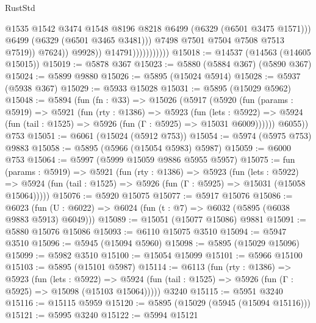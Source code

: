 \begin{lexlean}{RustStd}
\begin{coremodule}
{{                                          @1535
                                          @1542
                                          @3474
                                          @1548
                                          @8196
                                          @8218
                                          @6499
                                          (@6329 (@6501 @3475 @1571)))
                                        @6499
                                        (@6329 (@6501 @3465 @3481)))
                                      @7498
                                      @7501
                                      @7504
                                      @7508
                                      @7513
                                      @7519))
                                  @7624))
                              @9928))
                          @14791)))))))))))
@15018 := @14537 (@14563 (@14605 @15015))
@15019 := @5878 @367
@15023 := @5880 (@5884 @367) (@5890 @367)
@15024 := @5899 @9880
@15026 := @5895 (@15024 @5914)
@15028 := @5937 (@5938 @367)
@15029 := @5933 @15028
@15031 := @5895 (@15029 @5962)
@15048 := @5894
    (fun (fn : @33) =>
    @15026
      (@5917
        (@5920
          (fun (params : @5919) =>
          @5921
            (fun (rty : @1386) =>
            @5923
              (fun (lets : @5922) =>
              @5924 (fun (tail : @1525) => @5926 (fun (Γ : @5925) => @15031 @6009))))))
        @6055))
    @753
@15051 := @6061 (@15024 (@5912 @753))
@15054 := @5974 (@5975 @753) @9883
@15058 := @5895 (@5966 (@15054 @5983) @5987)
@15059 := @6000 @753
@15064 := @5997 (@5999 @15059 @9886 @5955 @5957)
@15075 := fun (params : @5919) =>
  @5921
    (fun (rty : @1386) =>
    @5923
      (fun (lets : @5922) =>
      @5924 (fun (tail : @1525) => @5926 (fun (Γ : @5925) => @15031 (@15058 @15064)))))
@15076 := @5920 @15075
@15077 := @5917 @15076
@15086 := @6023 (fun (U : @6022) => @6024 (fun (t : @7) => @6032 (@5895 (@6038 @9883 @5913) @6049)))
@15089 := @15051 (@15077 @15086) @9881
@15091 := @5880 @15076 @15086
@15093 := @6110 @15075 @3510
@15094 := @5947 @3510
@15096 := @5945 (@15094 @5960)
@15098 := @5895 (@15029 @15096)
@15099 := @5982 @3510
@15100 := @15054 @15099
@15101 := @5966 @15100
@15103 := @5895 (@15101 @5987)
@15114 := @6113
    (fun (rty : @1386) =>
    @5923
      (fun (lets : @5922) =>
      @5924 (fun (tail : @1525) => @5926 (fun (Γ : @5925) => @15098 (@15103 @15064)))))
    @3240
@15115 := @5951 @3240
@15116 := @15115 @5959
@15120 := @5895 (@15029 (@5945 (@15094 @15116)))
@15121 := @5995 @3240
@15122 := @5994 @15121
}}
\end{coremodule}
\end{lexlean}
